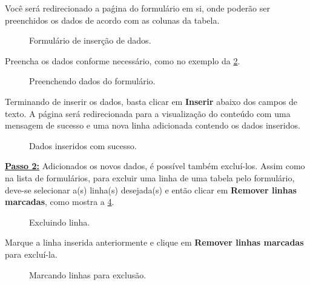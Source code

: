 \documentclass[9pt]{report}
\begin{document}
{      Você será redirecionado a paǵina do formulário em si, onde
      poderão ser preenchidos os dados de acordo com as colunas da
      tabela.
      
      \begin{figure}[H]
        \caption{Formulário de inserção de dados.}
        \label{fig:inserdados}
      \end{figure}

      Preencha os dados conforme necessário, como no exemplo da \figurename{ \ref{fig:prdados}}.
      
      \begin{figure}[H]
        \caption{Preenchendo dados do formulário.}
        \label{fig:prdados}
      \end{figure}

      Terminando de inserir os dados, basta clicar em
      \textbf{Inserir} abaixo dos campos de texto. A página será
      redirecionada para a visualização do conteúdo com uma mensagem
      de sucesso e uma nova linha adicionada contendo os dados
      inseridos.

      \begin{figure}[H]
        \caption{Dados inseridos com sucesso.}
        \label{fig:insersucesso}
      \end{figure}

      \underline{\textbf{Passo 2:}} Adicionados os novos dados, é
      possível também excluí-los. Assim como na lista de formulários, para excluir uma linha de uma tabela pelo formulário, deve-se selecionar a(s) linha(s) desejada(s) e então clicar em \textbf{Remover linhas marcadas}, como mostra a \figurename{ \ref{fig:linhasexclusao}}.

      \begin{figure}[H]
        \caption{Excluindo linha.}
        \label{fig:linhasexclusao}
      \end{figure}

      Marque a linha inserida anteriormente e clique em \textbf{Remover linhas marcadas} para excluí-la.

      \begin{figure}[H]
        \caption{Marcando linhas para exclusão.}
        \label{fig:linhamarcada}
      \end{figure}
      
}
\end{document}
